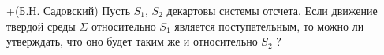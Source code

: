 +(Б.Н. Садовский)
Пусть $S_{1}$, $S_{2}$  декартовы системы отсчета. Если движение твердой среды $\Sigma$
относительно $S_{1}$ является поступательным, то можно ли утверждать,
что оно будет таким же и относительно $S_{2}$ ?
